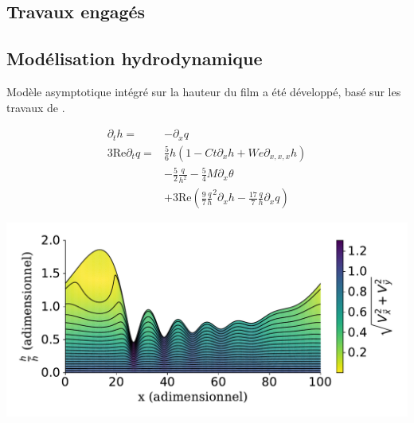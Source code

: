 \documentclass[a0,portrait]{a0poster}
\begin{document}
\begin{multicols}{2}

    \section*{Travaux engagés}
    \subsection*{Modélisation hydrodynamique}
    Modèle asymptotique intégré sur la hauteur du film a été développé, basé sur les travaux de \textcite{Ruyer-Quil2000}.

    \begin{multicols}{2}
        \begin{align*}
            \partial_t h =& -\partial_x q\\
            3 \mathrm{Re} \partial_t q =& \frac{5}{6} h
                \left(
                    1 - Ct \partial_x h + We \partial_{x,x,x} h
                \right)\\
            & - \frac{5}{2}\frac{q}{h^2}
            - \frac{5}{4} M \partial_x \theta \\
            & + 3 \mathrm{Re}
                \left(
                    \frac{9}{7}\frac{q}{h}^2 \partial_x h - \frac{17}{7}\frac{q}{h} \partial_x q
                \right)
        \end{align*}
        \columnbreak
        \begin{center}\vspace{.5cm}
            \includegraphics[width=0.95\columnwidth]{01-established_wave_streamlines}
            \label{fig:streamlines}
        \end{center}\vspace{.5cm}
    \end{multicols}


\end{multicols}
\end{document}
